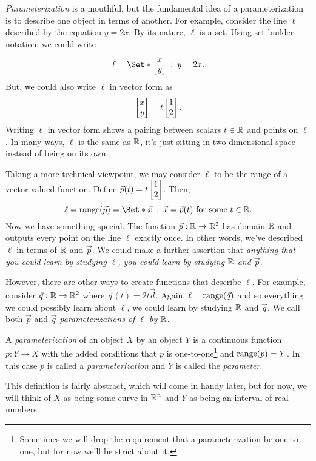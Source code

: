 \emph{Parameterization} is a mouthful, but the
fundamental idea of a parameterization is to describe one object in
terms of another.  For example, consider the line $\ell$ described
by the equation $y=2x$.  By its nature, $\ell$ is a set.
Using set-builder notation, we could write
\[
	\ell = \Set*{\mat{x\\y}\given y=2x}.
\]
But, we could also write $\ell$ in vector form as 
\[
	\mat{x\\y}=t\mat{1\\2}.
\]
Writing $\ell$ in vector form shows a pairing between scalars $t\in \mathbb{R}$
and points on $\ell$.  In many ways, $\ell$ is the same as $\mathbb{R}$, it's
just sitting in two-dimensional space instead of being on its own.

Taking a more technical viewpoint, we may consider $\ell$ to be the range of 
a vector-valued function.  Define $\vec p(t) = t\mat{1\\2}$.  Then,
\[
	\ell = \Range(\vec p) = \Set*{\vec x\given \vec x=\vec p(t)\text{ for some }t\in\R}.
\]
Now we have something special.  The function $\vec p:\mathbb{R}\to\mathbb{R}^2$ has domain $\mathbb{R}$ and outputs
every point on the line $\ell$ exactly once.  In other words, we've described
$\ell$ in terms of $\mathbb{R}$ and $\vec p$.  We could make a further assertion
that \emph{anything that you could learn by studying $\ell$, you could learn
by studying $\mathbb{R}$ and $\vec p$}.

However, there are other ways to create functions that describe $\ell$.
For example, consider $\vec q:\mathbb{R}\to\mathbb{R}^2$ where $\vec q(t)=2t\vec d$.  Again,
$\ell = \operatorname{range}(\vec q)$ and so everything we could possibly learn about
$\ell$, we could learn by studying $\mathbb{R}$ and $\vec q$.
We call both $\vec p$ and $\vec q$ \emph{parameterizations of $\ell$ by $\mathbb{R}$}.

\begin{definition}[Parameterization]
	A \emph{parameterization} of an object $X$ by an object $Y$ is a continuous
	function $p:Y\to X$ with the added conditions that $p$ is one-to-one\footnote{
	Sometimes we will drop the requirement that a parameterization be one-to-one,
	but for now we'll be strict about it.}
	and $\operatorname{range}(p)= Y$.  In this case $p$ is called a \emph{parameterization} and $Y$ is
	called the \emph{parameter}.
\end{definition}

This definition is fairly abstract, which will come in handy later, but for
now, we will think of $X$ as being some curve in $\mathbb{R}^n$ and $Y$ as being an
interval of real numbers.

